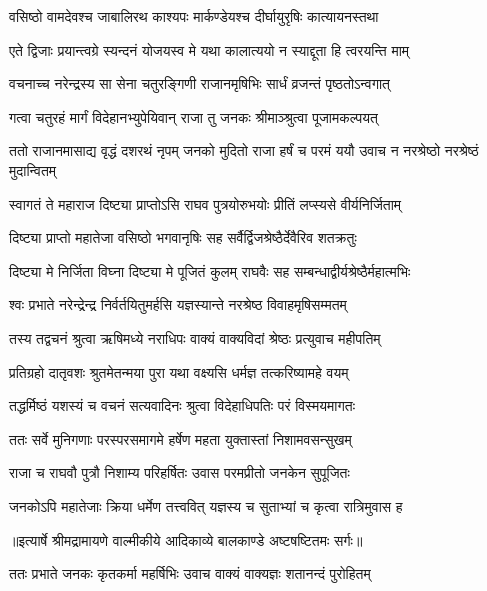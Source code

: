 \twolineshloka
{वसिष्ठो वामदेवश्च जाबालिरथ काश्यपः}
{मार्कण्डेयश्च दीर्घायुरृषिः कात्यायनस्तथा} %

\twolineshloka
{एते द्विजाः प्रयान्त्वग्रे स्यन्दनं योजयस्व मे}
{यथा कालात्ययो न स्याद्दूता हि त्वरयन्ति माम्} %

\twolineshloka
{वचनाच्च नरेन्द्रस्य सा सेना चतुरङ्गिणी}
{राजानमृषिभिः सार्धं व्रजन्तं पृष्ठतोऽन्वगात्} %

\twolineshloka
{गत्वा चतुरहं मार्गं विदेहानभ्युपेयिवान्}
{राजा तु जनकः श्रीमाञ्श्रुत्वा पूजामकल्पयत्} %

\threelineshloka
{ततो राजानमासाद्य वृद्धं दशरथं नृपम्}
{जनको मुदितो राजा हर्षं च परमं ययौ}
{उवाच न नरश्रेष्ठो नरश्रेष्ठं मुदान्वितम्} %

\twolineshloka
{स्वागतं ते महाराज दिष्ट्या प्राप्तोऽसि राघव}
{पुत्रयोरुभयोः प्रीतिं लप्स्यसे वीर्यनिर्जिताम्} %

\twolineshloka
{दिष्ट्या प्राप्तो महातेजा वसिष्ठो भगवानृषिः}
{सह सर्वैर्द्विजश्रेष्ठैर्देवैरिव शतक्रतुः} %

\twolineshloka
{दिष्ट्या मे निर्जिता विघ्ना दिष्ट्या मे पूजितं कुलम्}
{राघवैः सह सम्बन्धाद्वीर्यश्रेष्ठैर्महात्मभिः} %

\twolineshloka
{श्वः प्रभाते नरेन्द्रेन्द्र निर्वर्तयितुमर्हसि}
{यज्ञस्यान्ते नरश्रेष्ठ विवाहमृषिसम्मतम्} %

\twolineshloka
{तस्य तद्वचनं श्रुत्वा ऋषिमध्ये नराधिपः}
{वाक्यं वाक्यविदां श्रेष्ठः प्रत्युवाच महीपतिम्} %

\twolineshloka
{प्रतिग्रहो दातृवशः श्रुतमेतन्मया पुरा}
{यथा वक्ष्यसि धर्मज्ञ तत्करिष्यामहे वयम्} %

\twolineshloka
{तद्धर्मिष्ठं यशस्यं च वचनं सत्यवादिनः}
{श्रुत्वा विदेहाधिपतिः परं विस्मयमागतः} %

\twolineshloka
{ततः सर्वे मुनिगणाः परस्परसमागमे}
{हर्षेण महता युक्तास्तां निशामवसन्सुखम्} %

\twolineshloka
{राजा च राघवौ पुत्रौ निशाम्य परिहर्षितः}
{उवास परमप्रीतो जनकेन सुपूजितः} %

\twolineshloka
{जनकोऽपि महातेजाः क्रिया धर्मेण तत्त्ववित्}
{यज्ञस्य च सुताभ्यां च कृत्वा रात्रिमुवास ह} %


{॥इत्यार्षे श्रीमद्रामायणे वाल्मीकीये आदिकाव्ये बालकाण्डे अष्टषष्टितमः सर्गः॥}


\twolineshloka
{ततः प्रभाते जनकः कृतकर्मा महर्षिभिः}
{उवाच वाक्यं वाक्यज्ञः शतानन्दं पुरोहितम्} %

